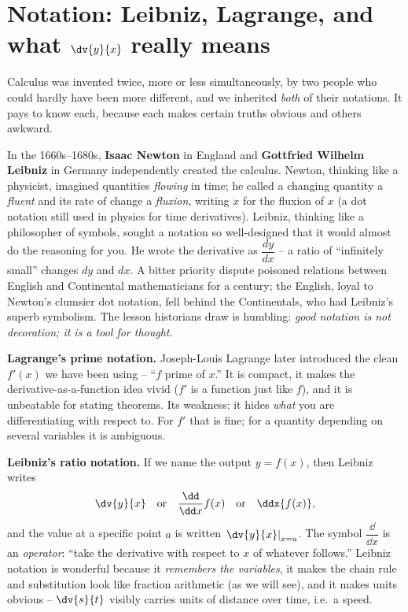 \section{Notation: Leibniz, Lagrange, and what $\dv{y}{x}$ really means}
\label{ch10:notation}

Calculus was invented twice, more or less simultaneously, by two people who could
hardly have been more different, and we inherited \emph{both} of their notations.
It pays to know each, because each makes certain truths obvious and others
awkward.

\begin{historybox}
In the 1660s--1680s, \textbf{Isaac Newton} in England and \textbf{Gottfried
Wilhelm Leibniz} in Germany independently created the calculus. Newton, thinking
like a physicist, imagined quantities \emph{flowing} in time; he called a
changing quantity a \emph{fluent} and its rate of change a \emph{fluxion},
writing $\dot{x}$ for the fluxion of $x$ (a dot notation still used in physics for
time derivatives). Leibniz, thinking like a philosopher of symbols, sought a
notation so well-designed that it would almost do the reasoning for you. He wrote
the derivative as $\dfrac{dy}{dx}$ -- a ratio of ``infinitely small'' changes
$dy$ and $dx$. A bitter priority dispute poisoned relations between English and
Continental mathematicians for a century; the English, loyal to Newton's clumsier
dot notation, fell behind the Continentals, who had Leibniz's superb symbolism.
The lesson historians draw is humbling: \emph{good notation is not decoration; it
is a tool for thought.}
\end{historybox}

\textbf{Lagrange's prime notation.} Joseph-Louis Lagrange later introduced the
clean $f'(x)$ we have been using -- ``$f$ prime of $x$.'' It is compact, it makes
the derivative-as-a-function idea vivid ($f'$ is a function just like $f$), and it
is unbeatable for stating theorems. Its weakness: it hides \emph{what} you are
differentiating with respect to. For $f'$ that is fine; for a quantity depending
on several variables it is ambiguous.

\textbf{Leibniz's ratio notation.} If we name the output $y = f(x)$, then Leibniz
writes
\[
  \dv{y}{x} \quad\text{or}\quad \frac{\dd}{\dd x}f(x) \quad\text{or}\quad
  \ddx{f(x)},
\]
and the value at a specific point $a$ is written
$\left.\dv{y}{x}\right|_{x=a}$. The symbol $\dfrac{\dd}{\dd x}$ is an
\emph{operator}: ``take the derivative with respect to $x$ of whatever follows.''
Leibniz notation is wonderful because it \emph{remembers the variables}, it makes
the chain rule and substitution look like fraction arithmetic (as we will see),
and it makes units obvious -- $\dv{s}{t}$ visibly carries units of distance over
time, i.e.\ a speed.

